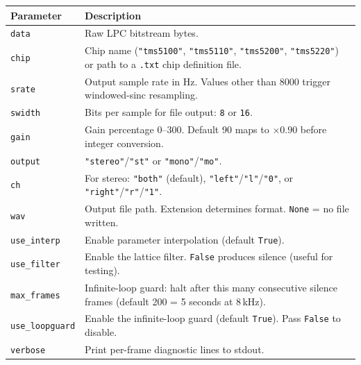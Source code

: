 \documentclass[10pt]{article}
\begin{document}
\begin{center}
\begin{tabular}{p{2.6cm}>{\raggedright\arraybackslash}p{9.5cm}}
\toprule
Parameter & Description \\
\midrule
\texttt{data}       & Raw LPC bitstream bytes. \\
\texttt{chip}       & Chip name (\texttt{"tms5100"}, \texttt{"tms5110"},
                      \texttt{"tms5200"}, \texttt{"tms5220"}) or path to a
                      \texttt{.txt} chip definition file. \\
\texttt{srate}      & Output sample rate in Hz.  Values other than 8000
                      trigger windowed-sinc resampling. \\
\texttt{swidth}     & Bits per sample for file output: \texttt{8} or
                      \texttt{16}. \\
\texttt{gain}       & Gain percentage 0--300.  Default 90 maps to $\times 0.90$
                      before integer conversion. \\
\texttt{output}     & \texttt{"stereo"}/\texttt{"st"} or
                      \texttt{"mono"}/\texttt{"mo"}. \\
\texttt{ch}         & For stereo: \texttt{"both"} (default),
                      \texttt{"left"}/\texttt{"l"}/\texttt{"0"}, or
                      \texttt{"right"}/\texttt{"r"}/\texttt{"1"}. \\
\texttt{wav}        & Output file path.  Extension determines format.
                      \texttt{None} = no file written. \\
\texttt{use\_interp}& Enable parameter interpolation (default
                      \texttt{True}). \\
\texttt{use\_filter}& Enable the lattice filter.  \texttt{False} produces
                      silence (useful for testing). \\
\texttt{max\_frames}& Infinite-loop guard: halt after this many consecutive
                      silence frames (default 200 = 5 seconds at 8\,kHz). \\
\texttt{use\_loopguard}& Enable the infinite-loop guard (default \texttt{True}).
                      Pass \texttt{False} to disable. \\
\texttt{verbose}    & Print per-frame diagnostic lines to stdout. \\
\bottomrule
\end{tabular}
\end{center}
\end{document}
